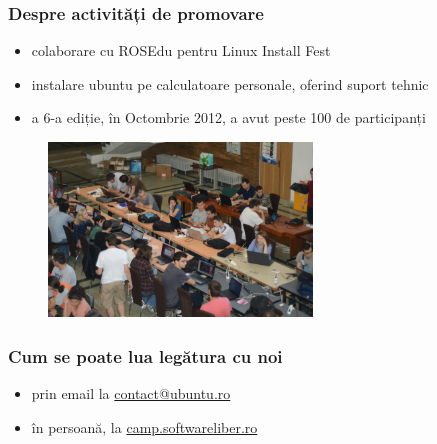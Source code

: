\documentclass[compress]{beamer}
\begin{document}
\begin{frame}
\frametitle{Despre activități de promovare}

\begin{itemize}[<+->]
  \item colaborare cu ROSEdu pentru Linux Install Fest
  \item instalare ubuntu pe calculatoare personale, oferind suport tehnic
  \item a 6-a ediție, în Octombrie 2012, a avut peste 100 de participanți
\end{itemize}

\begin{figure}[ht]
    \includegraphics[width=7cm]{./res/lif2012.jpg}
\end{figure} 
\end{frame}

\begin{frame}
\frametitle{Cum se poate lua legătura cu noi}

\begin{itemize}[<+->]
  \item prin email la \href{mailto://contact@ubuntu.ro}{contact@ubuntu.ro}
  \item în persoană, la \href{http://camp.softwareliber.ro/}{camp.softwareliber.ro}
\end{itemize}
\end{frame}
\end{document}
